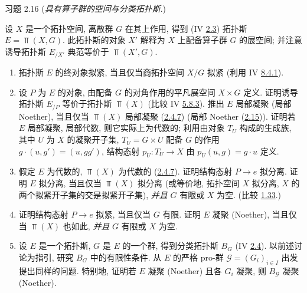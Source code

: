 \begin{enonce*}[remark]{习题 2.16}
(\emph{具有算子群的空间与分类拓扑斯}.)

设 $X$ 是一个拓扑空间, 离散群 $G$ 在其上作用,
得到 (IV \hyperref[IV.subsec2.3]{2.3}) 拓扑斯 $E = \Top(X, G)$.
此拓扑斯的对象 $X'$ 解释为 $X$ 上配备算子群 $G$ 的展空间;
并注意诱导拓扑斯 $E_{/X'}$ 典范等价于 $\Top(X', G)$.
\begin{enumerate}
\renewcommand{\theenumi}{\alph{enumi}}
\renewcommand{\labelenumi}{\theenumi)}
\item 拓扑斯 $E$ 的终对象拟紧,
当且仅当商拓扑空间 $X/G$ 拟紧
(利用 IV \hyperref[IV.subsubsec8.4.1]{8.4.1}).

\item 设 $P$ 为 $E$ 的对象,
由配备 $G$ 的对角作用的平凡展空间 $X \times G$ 定义.
证明诱导拓扑斯 $E_{/P}$ 等价于拓扑斯 $\Top(X)$
(比较 IV \hyperref[IV.subsubsec5.8.3]{5.8.3}).
推出 $E$ 局部凝聚 (\resp 局部 Noether),
当且仅当 $\Top(X)$ 局部凝聚
(\cf \hyperref[VI.subsubsec2.4.7]{2.4.7})
(\resp 局部 Noether (\cf \hyperref[VI.exem2.15]{2.15})).
证明若 $E$ 局部凝聚, \ie 局部代数, 则它实际上为代数的;
利用由对象 $T_U$ 构成\pageoriginale{}的生成族,
其中 $U$ 为 $X$ 的凝聚开子集,
$T_U = G \times U$ 配备 $G$ 的作用
$g \cdot (u, g') = (u, gg')$,
结构态射 $p_U : T_U \to X$
由 $p_U(u, g) = g\cdot u$ 定义.

\item 假定 $E$ 为代数的,
\ie $\Top(X)$ 为代数的 (\hyperref[VI.subsubsec2.4.7]{2.4.7}).
证明结构态射 $P \to e$ 拟分离.
证明 $E$ 拟分离,
当且仅当 $\Top(X)$ 拟分离
(或等价地, 拓扑空间 $X$ 拟分离,
\ie $X$ 的两个拟紧开子集的交是拟紧开子集),
\emph{并且} $G$ 有限或 $X$ 为空.
(比较 \hyperref[VI.exem1.33]{1.33}.)

\item 证明结构态射 $P \to e$ 拟紧,
当且仅当 $G$ 有限.
证明 $E$ 凝聚 (\resp Noether),
当且仅当 $\Top(X)$ 也如此,
\emph{并且} $G$ 有限或 $X$ 为空.

\item 设 $E$ 是一个拓扑斯, $G$ 是 $E$ 的一个群,
得到分类拓扑斯 $B_G$ (IV \hyperref[IV.subsec2.4]{2.4}).
以前述讨论为指引, 研究 $B_G$ 中的有限性条件.
从 $E$ 的严格 pro-群 $𝒢 = (G_i)_{i \in I}$ 出发提出同样的问题.
特别地, 证明若 $E$ 凝聚 (\resp Noether)
且各 $G_i$ 凝聚, 则 $B_{𝒢}$ 凝聚 (\resp Noether).
\end{enumerate}
\end{enonce*}

